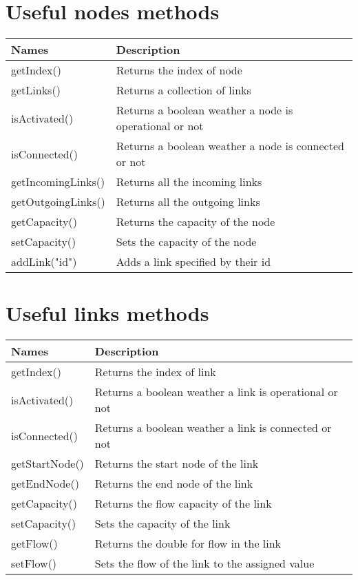 \documentclass[11pt,fleqn]{book} %
\begin{document}
\section{Useful nodes methods}\label{sec:node_methods}
\begin{table}[!ht]
\centering
\begin{tabular}{| p{7cm} | p{9cm} |}
\hline
\rowcolor{Gray}
Names & Description \\
\hline
getIndex() & Returns the index of node\\
\hline
getLinks() & Returns a collection of links \\
\hline
isActivated() & Returns a boolean weather a node is operational or not \\
\hline
isConnected() & Returns a boolean weather a node is connected or not \\
\hline
getIncomingLinks() & Returns all the incoming links \\
\hline
getOutgoingLinks() & Returns all the outgoing links \\
\hline
getCapacity() & Returns the capacity of the node \\
\hline
setCapacity() & Sets the capacity of the node \\
\hline
addLink({"id"}) & Adds a link specified by their id \\
\hline
\end{tabular}
\end{table}


\section{Useful links methods}\label{sec:link_methods}
\begin{table}[!ht]
\centering
\begin{tabular}{| p{7cm} | p{9cm} |}
\hline
\rowcolor{Gray}
Names & Description \\
\hline
getIndex() &  Returns the index of link\\
\hline
isActivated() & Returns a boolean weather a link is operational or not \\
\hline
isConnected() & Returns a boolean weather a link is connected or not \\
\hline
getStartNode() & Returns the start node of the link \\
\hline
getEndNode() & Returns the end node of the link \\
\hline
getCapacity() & Returns the flow capacity of the link \\
\hline
setCapacity() & Sets the capacity of the link \\
\hline
getFlow() & Returns the double for flow in the link \\
\hline
setFlow() & Sets the flow of the link to the assigned value \\
\hline
\end{tabular}
\end{table}
\end{document}
